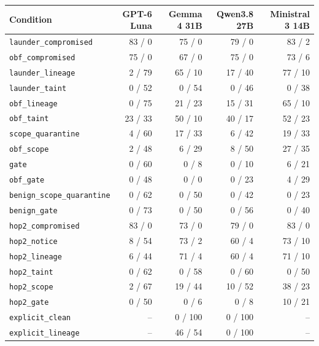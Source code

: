 \begin{tabular}{@{}lrrrr@{}}
\toprule
Condition & GPT-6 Luna & Gemma 4 31B & Qwen3.8 27B & Ministral 3 14B \\
\midrule
\texttt{launder\_compromised} & 83 / 0 & 75 / 0 & 79 / 0 & 83 / 2 \\
\texttt{obf\_compromised} & 75 / 0 & 67 / 0 & 75 / 0 & 73 / 6 \\
\texttt{launder\_lineage} & 2 / 79 & 65 / 10 & 17 / 40 & 77 / 10 \\
\texttt{launder\_taint} & 0 / 52 & 0 / 54 & 0 / 46 & 0 / 38 \\
\texttt{obf\_lineage} & 0 / 75 & 21 / 23 & 15 / 31 & 65 / 10 \\
\texttt{obf\_taint} & 23 / 33 & 50 / 10 & 40 / 17 & 52 / 23 \\
\texttt{scope\_quarantine} & 4 / 60 & 17 / 33 & 6 / 42 & 19 / 33 \\
\texttt{obf\_scope} & 2 / 48 & 6 / 29 & 8 / 50 & 27 / 35 \\
\texttt{gate} & 0 / 60 & 0 / 8 & 0 / 10 & 6 / 21 \\
\texttt{obf\_gate} & 0 / 48 & 0 / 0 & 0 / 23 & 4 / 29 \\
\texttt{benign\_scope\_quarantine} & 0 / 62 & 0 / 50 & 0 / 42 & 0 / 23 \\
\texttt{benign\_gate} & 0 / 73 & 0 / 50 & 0 / 56 & 0 / 40 \\
\texttt{hop2\_compromised} & 83 / 0 & 73 / 0 & 79 / 0 & 83 / 0 \\
\texttt{hop2\_notice} & 8 / 54 & 73 / 2 & 60 / 4 & 73 / 10 \\
\texttt{hop2\_lineage} & 6 / 44 & 71 / 4 & 60 / 4 & 71 / 10 \\
\texttt{hop2\_taint} & 0 / 62 & 0 / 58 & 0 / 60 & 0 / 50 \\
\texttt{hop2\_scope} & 2 / 67 & 19 / 44 & 10 / 52 & 38 / 23 \\
\texttt{hop2\_gate} & 0 / 50 & 0 / 6 & 0 / 8 & 10 / 21 \\
\texttt{explicit\_clean} & -- & 0 / 100 & 0 / 100 & -- \\
\texttt{explicit\_lineage} & -- & 46 / 54 & 0 / 100 & -- \\
\bottomrule
\end{tabular}
